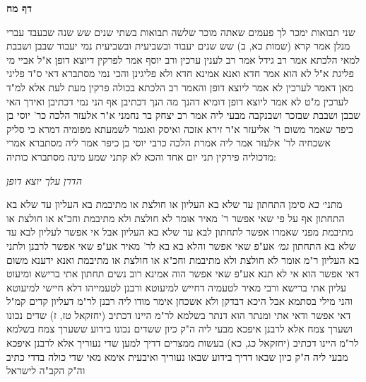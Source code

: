 \documentclass[12pt, openany]{book}
\newcommand{\sethebfont}{
\fontsize{10.5pt}{21.0pt} \selectfont
}
\newcommand{\twocol}[1]{
	{\sethebfont \begin{multicols}{2}
			#1
	\end{multicols}}	
}
\newcommand{\sectname}{}
\newcommand{\newsection}[1]{
	\addcontentsline{toc}{section}{#1}
	\renewcommand{\sectname}{#1}	
	\vspace{-\baselineskip}
	\begin{center}
		\textbf{%
\fontsize{16pt}{16pt}\selectfont
			#1}
	\end{center}
	\vspace{-\baselineskip}
	\nopagebreak
}
\begin{document}
\newsection{דף מח}
\twocol{שני תבואות ימכר לך פעמים שאתה מוכר שלשה תבואות בשתי שנים 
שש שנה שבעבד עברי מנלן אמר קרא (שמות כא, ב) שש שנים יעבוד ובשביעית ובשביעית נמי יעבוד 
שבבן ושבבת למאי הלכתא אמר רב גידל אמר רב לענין ערכין ורב יוסף אמר לפרקין דיוצא דופן 
א"ל אביי מי פליגת א"ל לא הוא אמר חדא ואנא אמינא חדא ולא פליגינן 
והכי נמי מסתברא דאי ס"ד פליגי מאן דאמר לערכין לא אמר ליוצא דופן והאמר רב הלכתא בכולה פרקין מעת לעת 
אלא למ"ד לערכין מ"ט לא אמר ליוצא דופן דומיא דהנך מה הנך דכתיבן אף הני נמי דכתיבן 
ואידך האי שבבן ושבבת שבזכר ושבנקבה מבעי ליה 
אמר רב יצחק בר נחמני א"ר אלעזר הלכה כר' יוסי בן כיפר שאמר משום ר' אליעזר א"ר זירא אזכה ואיסק ואגמר לשמעתא מפומיה דמרא 
כי סליק אשכחיה לר' אלעזר אמר ליה אמרת הלכה כרבי יוסי בן כיפר אמר ליה מסתברא אמרי מדכוליה פירקין תני יום אחד והכא לא קתני שמע מינה מסתברא כותיה:
\par \par {\large\emph{הדרן עלך יוצא דופן}}\par \par 
מתני׳ {\large\emph{בא}} סימן התחתון עד שלא בא העליון או חולצת או מתיבמת
בא העליון עד שלא בא התחתון אף על פי שאי אפשר ר' מאיר אומר לא חולצת ולא מתיבמת
וחכ"א או חולצת או מתיבמת מפני שאמרו אפשר לתחתון לבא עד שלא בא העליון אבל אי אפשר לעליון לבא עד שלא בא התחתון
{\large\emph{גמ׳}} אע"פ שאי אפשר והלא בא בא לר' מאיר אע"פ שאי אפשר לרבנן 
ולתני בא העליון ר"מ אומר לא חולצת ולא מתיבמת וחכ"א או חולצת או מתיבמת ואנא ידענא משום דאי אפשר הוא 
אי לא תנא אע"פ שאי אפשר הוה אמינא רוב נשים תחתון אתי ברישא ומיעוט עליון אתי ברישא ורבי מאיר לטעמיה דחייש למיעוטא ורבנן לטעמייהו דלא חיישי למיעוטא 
והני מילי בסתמא אבל היכא דבדקן ולא אשכחן אימר מודו ליה רבנן לר"מ דעליון קדים
קמ"ל דאי אפשר ודאי אתי ומנתר הוא דנתר 
בשלמא לר"מ היינו דכתיב (יחזקאל טז, ז) שדים נכונו ושערך צמח אלא לרבנן איפכא מבעי ליה ה"ק כיון ששדים נכונו בידוע ששערך צמח 
בשלמא לר"מ היינו דכתיב (יחזקאל כג, כא) בעשות ממצרים דדיך למען שדי נעוריך אלא לרבנן איפכא מבעי ליה 
ה"ק כיון שבאו דדיך בידוע שבאו נעוריך ואיבעית אימא מאי שדי כולה בדדי כתיב וה"ק הקב"ה לישראל}
\end{document}
